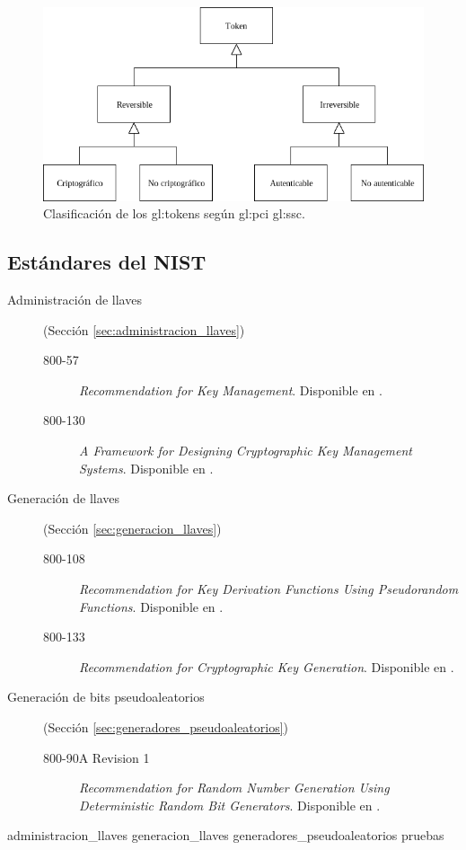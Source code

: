 \begin{figure}[h]
  \begin{center}
    \includegraphics[width=0.75\linewidth]{diagramas/clasificacion.png}
    \caption{Clasificación de los \glspl{gl:token}
      según \gls{gl:pci} \gls{gl:ssc}.}
    \label{fig:division_tokens}
  \end{center}
\end{figure}

\subsection{Estándares del NIST}

\begin{description}

  \item[Administración de llaves] (Sección \ref{sec:administracion_llaves})
    \begin{description}
      \item[800-57] \textit{Recommendation for Key Management}. Disponible en
        \cite{nist_llaves}.
      \item[800-130] \textit{A Framework for Designing Cryptographic Key
        Management Systems}. Disponible en \cite{nist_disenio_llaves}.
    \end{description}

  \item[Generación de llaves] (Sección \ref{sec:generacion_llaves})
    \begin{description}
      \item[800-108] \textit{Recommendation for Key Derivation Functions Using
        Pseudorandom Functions}. Disponible en \cite{nist_derivacion_llaves}.
      \item[800-133] \textit{Recommendation for Cryptographic Key Generation}.
        Disponible en \cite{nist_creacion_llaves}.
    \end{description}

  \item[Generación de bits pseudoaleatorios] (Sección
    \ref{sec:generadores_pseudoaleatorios})
    \begin{description}
      \item[800-90A Revision 1] \textit{Recommendation for Random Number Generation Using
        Deterministic Random Bit Generators}. Disponible en
        \cite{nist_aleatorios}.
    \end{description}
\end{description}

{administracion_llaves}
{generacion_llaves}
{generadores_pseudoaleatorios}
{pruebas}
